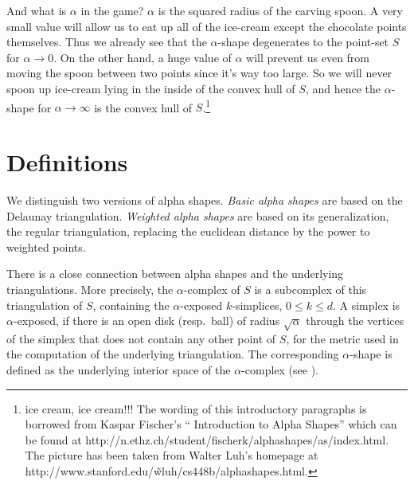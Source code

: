 And what is $\alpha$ in the game?  $\alpha$ is the squared radius of the
carving spoon. A very small value will allow us to eat up all of the
ice-cream except the chocolate points themselves. Thus we already see
that the $\alpha$-shape degenerates to the point-set $S$ for
$\alpha \rightarrow 0$. On the other hand, a huge value of $\alpha$
will prevent us even from moving the spoon between two points since
it's way too large. So we will never spoon up ice-cream lying in the
inside of the convex hull of $S$, and hence the $\alpha$-shape for
$\alpha \rightarrow \infty$ is the convex hull of $S$.\footnote{ice cream, ice cream!!!
The wording of this introductory paragraphs is borrowed from  Kaspar Fischer's
`` Introduction to Alpha Shapes'' which can be found at 
http://n.ethz.ch/student/fischerk/alphashapes/as/index.html.
The picture has been taken from Walter Luh's homepage at
http://www.stanford.edu/\~wluh/cs448b/alphashapes.html.}


\section{Definitions}


We distinguish two versions of alpha shapes.  {\em Basic alpha shapes}
are based on the Delaunay triangulation.  {\em Weighted alpha shapes}
are based on its generalization, the regular triangulation, replacing
the euclidean distance by the power to weighted points. 


There is a close connection between alpha shapes and the underlying
triangulations. More precisely, the $\alpha$-complex of $S$ is a
subcomplex of this triangulation of $S$, containing the $\alpha$-exposed
$k$-simplices, $0 \leq k \leq d$. A simplex is $\alpha$-exposed, if there is an
open disk (resp.\ ball) of radius $\sqrt{\alpha}$ through the vertices of the
simplex that does not contain any other point of $S$, for the metric used in
the computation of the underlying triangulation.  The corresponding
$\alpha$-shape is defined as the underlying interior space of the
$\alpha$-complex (see \cite{em-tdas-94}). 

